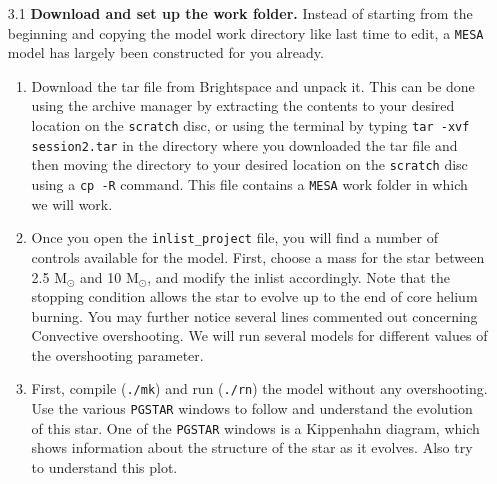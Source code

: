 \documentclass[11pt,a4paper]{article}
\begin{document}
\begin{enumerate}

\item[3.1] \textbf{Download and set up the work folder.} 
Instead of starting from the beginning and copying the model work directory like last time to edit, a \texttt{MESA} model has largely been constructed for you already. 


\begin{enumerate} 

    \item Download the tar file from Brightspace and unpack it. This can be done using the archive manager by extracting the contents to your desired location on the \texttt{scratch} disc, or using the terminal by typing \verb|tar -xvf session2.tar| in the directory where you downloaded the tar file and then moving the directory to your desired location on the \texttt{scratch} disc using a \texttt{cp -R} command. This file contains a \texttt{MESA} work folder in which we will work. 
    
    \item Once you open the \verb|inlist_project| file, you will find a number of controls available for the model. First, choose a mass for the star between 2.5 M$_\odot$ and 10 M$_\odot$, and modify the inlist accordingly. Note that the stopping condition allows the star to evolve up to the end of core helium burning. You may further notice several lines commented out concerning Convective overshooting. We will run several models for different values of the overshooting parameter. 

    \item First, compile (\verb|./mk|) and run (\verb|./rn|) the model without any overshooting. 
    Use the various \texttt{PGSTAR} windows to follow and understand the evolution of this star. One of the \texttt{PGSTAR} windows is a Kippenhahn diagram, which shows information about the structure of the star as it evolves. Also try to understand this plot.



\end{enumerate}
\end{enumerate}
\end{document}
